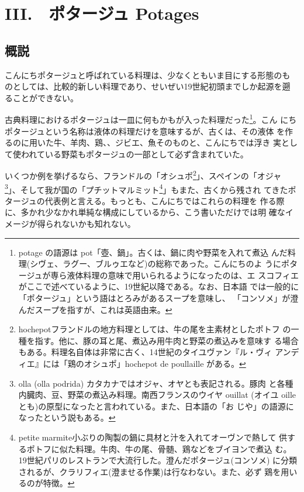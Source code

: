 \href{原稿下準備20180414五島、連載からコピー}{} \href{訳と注釈}{}
\href{未、原文対照チェック}{} \href{未、日本語表現校正}{}
\href{未、その他修正}{} \href{未、原稿最終校正}{}

\hypertarget{potages}{%
\chapter{III.　ポタージュ Potages}\label{potages}}

\hypertarget{considerations-generales-potages}{%
\section{概説}\label{considerations-generales-potages}}


こんにちポタージュと呼ばれている料理は、少なくともいま目にする形態のも
のとしては、比較的新しい料理であり、せいぜい19世紀初頭までしか起源を遡
ることができない。

古典料理におけるポタージュは一皿に何もかもが入った料理だった\footnote{potage
  の語源は pot「壺、鍋」。古くは、鍋に肉や野菜を入れて煮込
  んだ料理(シヴェ、ラグー、ブルゥエなど)の総称であった。こんにちのよ
  うにポタージュが専ら液体料理の意味で用いられるようになったのは、エ
  スコフィエがここで述べているように、19世紀以降である。なお、日本語
  では一般的に「ポタージュ」という語はとろみがあるスープを意味し、
  「コンソメ」が澄んだスープを指すが、これは英語由来。}。こん
にちポタージュという名称は液体の料理だけを意味するが、古くは、その液体
を作るのに用いた牛、羊肉、鶏、、ジビエ、魚そのものと、こんにちでは浮き
実として使われている野菜もポタージュの一部として必ず含まれていた。

いくつか例を挙げるなら、フランドルの「オシュポ\footnote{hochepotフランドルの地方料理としては、牛の尾を主素材としたポトフ
  の一種を指す。他に、豚の耳と尾、煮込み用牛肉と野菜の煮込みを意味す
  る場合もある。料理名自体は非常に古く、14世紀のタイユヴァン『ル・ヴィ
  アンディエ』には「鶏のオシュポ」hochepot de poullaille がある。}」、スペインの「オジャ
\footnote{olla (olla podrida)
  カタカナではオジャ、オヤとも表記される。豚肉
  と各種内臓肉、豆、野菜の煮込み料理。南西フランスのウイヤ ouillat
  (オイユ oilleとも)の原型になったと言われている。また、日本語の「お
  じや」の語源になったという説もある。}」、そして我が国の「プチットマルミット\footnote{petite
  marmite小ぶりの陶製の鍋に具材と汁を入れてオーヴンで熱して
  供するポトフに似た料理。牛肉、牛の尾、骨髄、鶏などをブイヨンで煮込
  む。19世紀パリのレストランで大流行した。澄んだポタージュ(コンソメ)
  に分類されるが、クラリフィエ(澄ませる作業)は行なわない。また、必ず
  鶏を用いるのが特徴。}」もまた、古くから残され
てきたポタージュの代表例と言える。もっとも、こんにちではこれらの料理を
作る際に、多かれ少なかれ単純な構成にしているから、こう書いただけでは明
確なイメージが得られないかも知れない。

